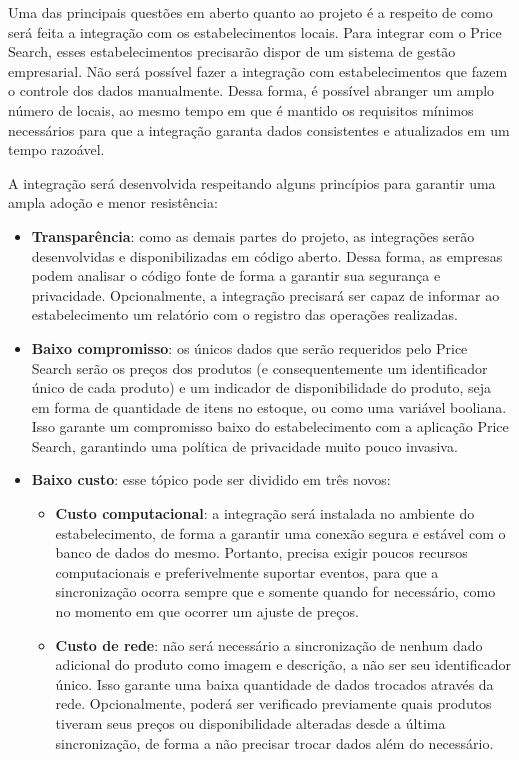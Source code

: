 Uma das principais questões em aberto quanto ao projeto é a respeito de como será feita a integração com os estabelecimentos locais. Para integrar com o Price Search, esses estabelecimentos precisarão dispor de um sistema de gestão empresarial. Não será possível fazer a integração com estabelecimentos que fazem o controle dos dados manualmente. Dessa forma, é possível abranger um amplo número de locais, ao mesmo tempo em que é mantido os requisitos mínimos necessários para que a integração garanta dados consistentes e atualizados em um tempo razoável.

A integração será desenvolvida respeitando alguns princípios para garantir uma ampla adoção e menor resistência:
\begin{itemize}
    \item \textbf{Transparência}: como as demais partes do projeto, as integrações serão desenvolvidas e disponibilizadas em código aberto. Dessa forma, as empresas podem analisar o código fonte de forma a garantir sua segurança e privacidade. Opcionalmente, a integração precisará ser capaz de informar ao estabelecimento um relatório com o registro das operações realizadas.
    \item \textbf{Baixo compromisso}: os únicos dados que serão requeridos pelo Price Search serão os preços dos produtos (e consequentemente um identificador único de cada produto) e um indicador de disponibilidade do produto, seja em forma de quantidade de itens no estoque, ou como uma variável booliana. Isso garante um compromisso baixo do estabelecimento com a aplicação Price Search, garantindo uma política de privacidade muito pouco invasiva.
    \item \textbf{Baixo custo}: esse tópico pode ser dividido em três novos:
    \begin{itemize}
        \item \textbf{Custo computacional}: a integração será instalada no ambiente do estabelecimento, de forma a garantir uma conexão segura e estável com o banco de dados do mesmo. Portanto, precisa exigir poucos recursos computacionais e preferivelmente suportar eventos, para que a sincronização ocorra sempre que e somente quando for necessário, como no momento em que ocorrer um ajuste de preços.
        \item \textbf{Custo de rede}: não será necessário a sincronização de nenhum dado adicional do produto como imagem e descrição, a não ser seu identificador único. Isso garante uma baixa quantidade de dados trocados através da rede. Opcionalmente, poderá ser verificado previamente quais produtos tiveram seus preços ou disponibilidade alteradas desde a última sincronização, de forma a não precisar trocar dados além do necessário.

\end{itemize}
\end{itemize}
